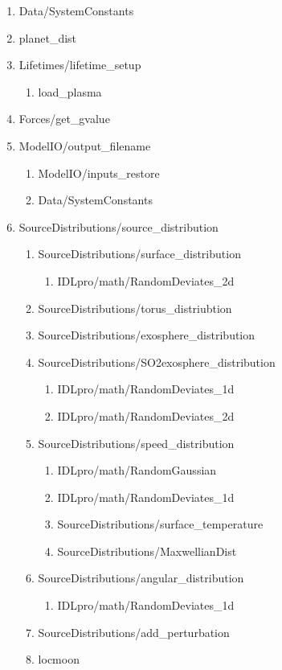 \documentclass[11pt]{article}
\begin{document}
\begin{enumerate}
\begin{enumerate}
  \item Data/SystemConstants
  \item planet\_dist
  \item Lifetimes/lifetime\_setup
    \begin{enumerate}
    \item load\_plasma
    \end{enumerate}
  \item Forces/get\_gvalue
  \item ModelIO/output\_filename
      \begin{enumerate}
      \item ModelIO/inputs\_restore
      \item Data/SystemConstants
      \end{enumerate}
  \item SourceDistributions/source\_distribution
    \begin{enumerate}
    \item SourceDistributions/surface\_distribution
      \begin{enumerate}
      \item IDLpro/math/RandomDeviates\_2d
      \end{enumerate}
    \item SourceDistributions/torus\_distriubtion
    \item SourceDistributions/exosphere\_distribution
    \item SourceDistributions/SO2exosphere\_distribution
      \begin{enumerate}
      \item IDLpro/math/RandomDeviates\_1d
      \item IDLpro/math/RandomDeviates\_2d
      \end{enumerate}
    \item SourceDistributions/speed\_distribution
      \begin{enumerate}
      \item IDLpro/math/RandomGaussian
      \item IDLpro/math/RandomDeviates\_1d
      \item SourceDistributions/surface\_temperature
      \item SourceDistributions/MaxwellianDist
      \end{enumerate}
    \item SourceDistributions/angular\_distribution
      \begin{enumerate}
      \item IDLpro/math/RandomDeviates\_1d
      \end{enumerate}
    \item SourceDistributions/add\_perturbation
    \item locmoon
    \end{enumerate}


\end{enumerate}
\end{enumerate}
\end{document}
